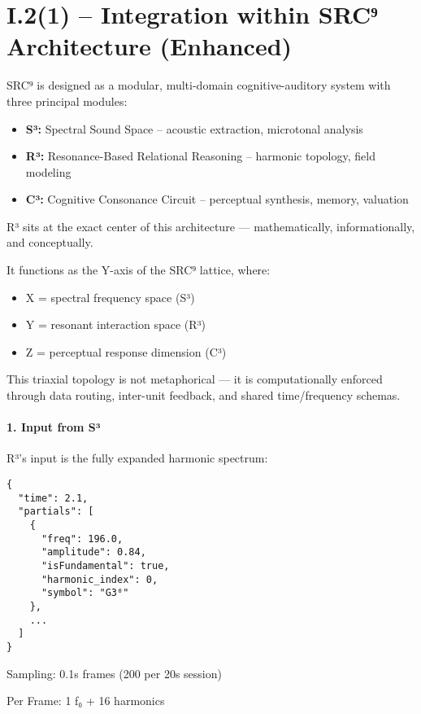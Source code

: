 \section*{I.2(1) – Integration within SRC⁹ Architecture (Enhanced)}

SRC⁹ is designed as a modular, multi-domain cognitive-auditory system with three principal modules:

\begin{itemize}
    \item \textbf{S³:} Spectral Sound Space – acoustic extraction, microtonal analysis
    \item \textbf{R³:} Resonance-Based Relational Reasoning – harmonic topology, field modeling
    \item \textbf{C³:} Cognitive Consonance Circuit – perceptual synthesis, memory, valuation
\end{itemize}

R³ sits at the exact center of this architecture — mathematically, informationally, and conceptually.

It functions as the Y-axis of the SRC⁹ lattice, where:

\begin{itemize}
    \item X = spectral frequency space (S³)
    \item Y = resonant interaction space (R³)
    \item Z = perceptual response dimension (C³)
\end{itemize}

This triaxial topology is not metaphorical — it is computationally enforced through data routing, inter-unit feedback, and shared time/frequency schemas.

\paragraph{1. Input from S³}

R³’s input is the fully expanded harmonic spectrum:

\begin{verbatim}
{
  "time": 2.1,
  "partials": [
    {
      "freq": 196.0,
      "amplitude": 0.84,
      "isFundamental": true,
      "harmonic_index": 0,
      "symbol": "G3⁰"
    },
    ...
  ]
}
\end{verbatim}

Sampling: 0.1s frames (200 per 20s session)

Per Frame: 1 f₀ + 16 harmonics


